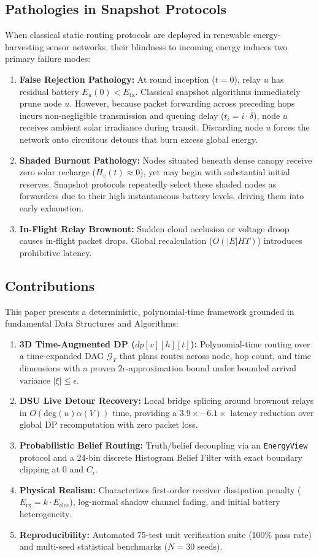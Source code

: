 \documentclass[conference]{IEEEtran}
\begin{document}
\subsection{Pathologies in Snapshot Protocols}
When classical static routing protocols are deployed in renewable energy-harvesting sensor networks, their blindness to incoming energy induces two primary failure modes:
\begin{enumerate}
    \item \textbf{False Rejection Pathology:} At round inception ($t = 0$), relay $u$ has residual battery $E_u(0) < E_{\text{tx}}$. Classical snapshot algorithms immediately prune node $u$. However, because packet forwarding across preceding hops incurs non-negligible transmission and queuing delay ($t_i = i \cdot \delta$), node $u$ receives ambient solar irradiance during transit. Discarding node $u$ forces the network onto circuitous detours that burn excess global energy.
    \item \textbf{Shaded Burnout Pathology:} Nodes situated beneath dense canopy receive zero solar recharge ($H_v(t) \approx 0$), yet may begin with substantial initial reserves. Snapshot protocols repeatedly select these shaded nodes as forwarders due to their high instantaneous battery levels, driving them into early exhaustion.
    \item \textbf{In-Flight Relay Brownout:} Sudden cloud occlusion or voltage droop causes in-flight packet drops. Global recalculation ($O(|E|HT)$) introduces prohibitive latency.
\end{enumerate}

\subsection{Contributions}
This paper presents a deterministic, polynomial-time framework grounded in fundamental Data Structures and Algorithms:
\begin{enumerate}
    \item \textbf{3D Time-Augmented DP ($dp[v][h][t]$):} Polynomial-time routing over a time-expanded DAG $\mathcal{G}_T$ that plans routes across node, hop count, and time dimensions with a proven $2\epsilon$-approximation bound under bounded arrival variance $|\xi| \le \epsilon$.
    \item \textbf{DSU Live Detour Recovery:} Local bridge splicing around brownout relays in $O(\text{deg}(u)\alpha(V))$ time, providing a $3.9\times - 6.1\times$ latency reduction over global DP recomputation with zero packet loss.
    \item \textbf{Probabilistic Belief Routing:} Truth/belief decoupling via an \texttt{EnergyView} protocol and a 24-bin discrete Histogram Belief Filter with exact boundary clipping at 0 and $C_i$.
    \item \textbf{Physical Realism:} Characterizes first-order receiver dissipation penalty ($E_{\text{rx}} = k \cdot E_{\text{elec}}$), log-normal shadow channel fading, and initial battery heterogeneity.
    \item \textbf{Reproducibility:} Automated 75-test unit verification suite (100\% pass rate) and multi-seed statistical benchmarks ($N=30$ seeds).
\end{enumerate}
\end{document}

